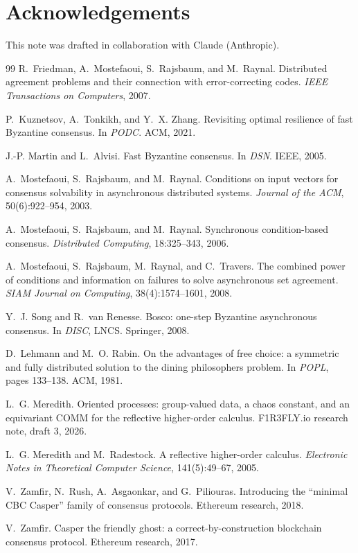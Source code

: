\documentclass[11pt]{article}
\theoremstyle{definition}
\theoremstyle{remark}
\begin{document}
\section*{Acknowledgements}
This note was drafted in collaboration with Claude (Anthropic).

\begin{thebibliography}{99}
R.~Friedman, A.~Mostefaoui, S.~Rajsbaum, and M.~Raynal.
\newblock Distributed agreement problems and their connection with
  error-correcting codes.
\newblock \emph{IEEE Transactions on Computers}, 2007.

P.~Kuznetsov, A.~Tonkikh, and Y.~X. Zhang.
\newblock Revisiting optimal resilience of fast Byzantine consensus.
\newblock In \emph{PODC}. ACM, 2021.

J.-P. Martin and L.~Alvisi.
\newblock Fast Byzantine consensus.
\newblock In \emph{DSN}. IEEE, 2005.

A.~Mostefaoui, S.~Rajsbaum, and M.~Raynal.
\newblock Conditions on input vectors for consensus solvability in
  asynchronous distributed systems.
\newblock \emph{Journal of the ACM}, 50(6):922--954, 2003.

A.~Mostefaoui, S.~Rajsbaum, and M.~Raynal.
\newblock Synchronous condition-based consensus.
\newblock \emph{Distributed Computing}, 18:325--343, 2006.

A.~Mostefaoui, S.~Rajsbaum, M.~Raynal, and C.~Travers.
\newblock The combined power of conditions and information on failures to
  solve asynchronous set agreement.
\newblock \emph{SIAM Journal on Computing}, 38(4):1574--1601, 2008.

Y.~J. Song and R.~van Renesse.
\newblock Bosco: one-step Byzantine asynchronous consensus.
\newblock In \emph{DISC}, LNCS. Springer, 2008.

D.~Lehmann and M.~O. Rabin.
\newblock On the advantages of free choice: a symmetric and fully distributed
  solution to the dining philosophers problem.
\newblock In \emph{POPL}, pages 133--138. ACM, 1981.

L.~G. Meredith.
\newblock Oriented processes: group-valued data, a chaos constant, and an
  equivariant COMM for the reflective higher-order calculus.
\newblock F1R3FLY.io research note, draft 3, 2026.

L.~G. Meredith and M.~Radestock.
\newblock A reflective higher-order calculus.
\newblock \emph{Electronic Notes in Theoretical Computer Science},
  141(5):49--67, 2005.

V.~Zamfir, N.~Rush, A.~Asgaonkar, and G.~Piliouras.
\newblock Introducing the ``minimal CBC Casper'' family of consensus protocols.
\newblock Ethereum research, 2018.

V.~Zamfir.
\newblock Casper the friendly ghost: a correct-by-construction blockchain
  consensus protocol.
\newblock Ethereum research, 2017.
\end{thebibliography}
\end{document}
